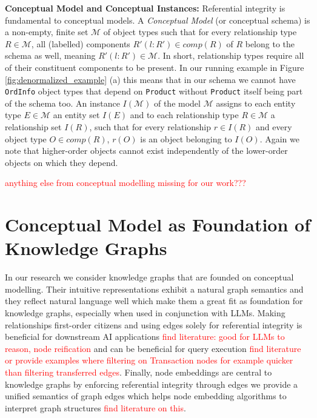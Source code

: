 \documentclass[sigconf]{acmart}
\begin{document}
\textbf{Conceptual Model and Conceptual Instances:} Referential integrity is fundamental to conceptual models. A \emph{Conceptual Model} (or conceptual schema) is a non-empty, finite set $\mathcal{M}$ of object types such that for every relationship type $R\in\mathcal{M}$, all (labelled) components $R'(l:R')\in\textit{comp}(R)$ of $R$ belong to the schema as well, meaning $R'(l:R')\in\mathcal{M}$. In short, relationship types require all of their constituent components to be present. In our running example in Figure \ref{fig:denormalized_example} (a) this means that in our schema we cannot have \texttt{OrdInfo} object types that depend on \texttt{Product} without \texttt{Product} itself being part of the schema too. An instance $I\mathcal{(M)}$ of the model $\mathcal{M}$ assigns to each entity type $E \in \mathcal{M}$ an entity set $I(E)$ and to each relationship type $R \in \mathcal{M}$ a relationship set $I(R)$, such that for every relationship $r \in I(R)$ and every object type $O \in \textit{comp}(R)$, $r(O)$ is an object belonging to $I(O)$. Again we note that higher-order objects cannot exist independently of the lower-order objects on which they depend.


\textcolor{red}{anything else from conceptual modelling missing for our work???}











\section{Conceptual Model as Foundation of Knowledge Graphs}\label{sec:er-kgs}

In our research we consider knowledge graphs that are founded on conceptual modelling. Their intuitive representations exhibit a natural graph semantics \cite{Skavantzos_25_ER_Graphs} and they reflect natural language well \cite{Chen_83_English_Language_and_ER_Diagram} which make them a great fit as foundation for knowledge graphs, especially when used in conjunction with LLMs. Making relationships first-order citizens and using edges solely for referential integrity is beneficial for downstream AI applications \textcolor{red}{find literature: good for LLMs to reason, node reification} and can be beneficial for query execution \textcolor{red}{find literature or provide examples where filtering on Transaction nodes for example quicker than filtering transferred edges}. Finally, node embeddings are central to knowledge graphs by enforcing referential integrity through edges we provide a unified semantics of graph edges which helps node embedding algorithms to interpret graph structures \textcolor{red}{find literature on this}.
\end{document}

